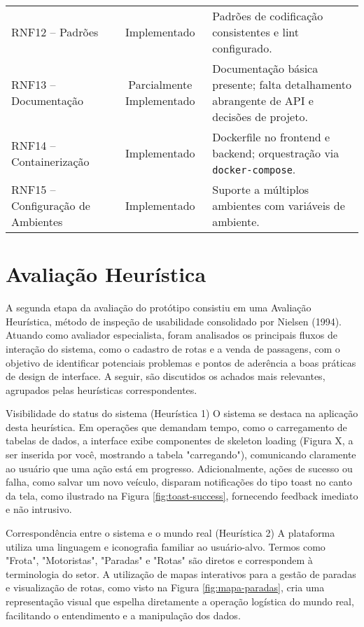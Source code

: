 \begin{table}[htbp]
{\begin{tabular}{|l|c|p{9.5cm}|}
      RNF12 -- Padrões                    & Implementado              & Padrões de codificação consistentes e lint configurado.                                   \\
      RNF13 -- Documentação               & Parcialmente Implementado & Documentação básica presente; falta detalhamento abrangente de API e decisões de projeto. \\
      RNF14 -- Containerização            & Implementado              & Dockerfile no frontend e backend; orquestração via \texttt{docker-compose}.               \\
      RNF15 -- Configuração de Ambientes  & Implementado              & Suporte a múltiplos ambientes com variáveis de ambiente.                                  \\
      \hline
    \end{tabular}%
  }
\end{table}

\section{Avaliação Heurística}
A segunda etapa da avaliação do protótipo consistiu em uma Avaliação Heurística, método de inspeção de usabilidade consolidado por Nielsen (1994). Atuando como avaliador especialista, foram analisados os principais fluxos de interação do sistema, como o cadastro de rotas e a venda de passagens, com o objetivo de identificar potenciais problemas e pontos de aderência a boas práticas de design de interface. A seguir, são discutidos os achados mais relevantes, agrupados pelas heurísticas correspondentes.

Visibilidade do status do sistema (Heurística 1)
O sistema se destaca na aplicação desta heurística. Em operações que demandam tempo, como o carregamento de tabelas de dados, a interface exibe componentes de skeleton loading (Figura X, a ser inserida por você, mostrando a tabela "carregando"), comunicando claramente ao usuário que uma ação está em progresso. Adicionalmente, ações de sucesso ou falha, como salvar um novo veículo, disparam notificações do tipo toast no canto da tela, como ilustrado na Figura \ref{fig:toast-success}, fornecendo feedback imediato e não intrusivo.

Correspondência entre o sistema e o mundo real (Heurística 2)
A plataforma utiliza uma linguagem e iconografia familiar ao usuário-alvo. Termos como "Frota", "Motoristas", "Paradas" e "Rotas" são diretos e correspondem à terminologia do setor. A utilização de mapas interativos para a gestão de paradas e visualização de rotas, como visto na Figura \ref{fig:mapa-paradas}, cria uma representação visual que espelha diretamente a operação logística do mundo real, facilitando o entendimento e a manipulação dos dados.

